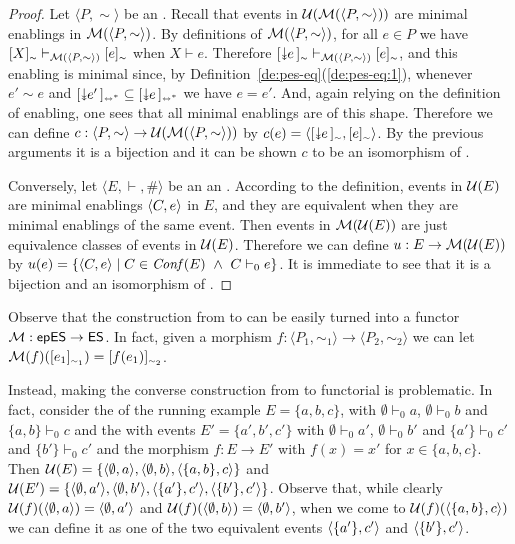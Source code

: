 \begin{proof}
  Let $\langle P, \sim \rangle$ be an {\eseqabbr}.
  Recall that events in
  $\unf{\fuse{\langle P, \sim\rangle}}$ are minimal
  enablings in $\fuse{\langle P, \sim\rangle}$.
  By definitions of $\fuse{\langle P, \sim\rangle}$, for all $e \in P$
  we have
  $\eqclass[\sim]{X} \vdash_{\fuse{\langle P, \sim\rangle}}
  \eqclass[\sim]{e}$ when $X \vdash e$. Therefore
  $\eqclass[\sim]{\scauses{e}} \vdash_{\fuse{\langle P, \sim\rangle}}
  \eqclass[\sim]{e}$, and this enabling is minimal since, by
  Definition~\ref{de:pes-eq}(\ref{de:pes-eq:1}), whenever $e' \sim e$
  and $\eqclassir{\scauses{e'}} \subseteq \eqclassir{\scauses{e}}$ we
  have $e=e'$. And, again relying on the definition of enabling, one
  sees that all minimal enablings are of this shape.
  Therefore we can define
  $c : \langle P, \sim \rangle \to \unf{\fuse{\langle P,
      \sim\rangle}}$ by
  $c(e) =
  \esir{\eqclass[\sim]{\scauses{e}}}{\eqclass[\sim]{e}}$.
  By the previous arguments it is a bijection and it can be shown $c$
  to be an isomorphism of {\eseqabbr}.
  

  \smallskip

  Conversely, let $\langle E, \vdash, \# \rangle$ be an an
  {\esabbr}.
  According to the definition, events in $\unf{E}$ are minimal
  enablings $\esir{C}{e}$ in $E$, and they are equivalent when they are minimal
  enablings of the same event.
  Then events in $\fuse{\unf{E}}$ are just equivalence classes of events in $\unf{E}$. Therefore we can define $u : E \to \fuse{\unf{E}}$ by
  $u(e) = \{ \esir{C}{e} \mid C \in \conf{E}\ \land\ C \vdash_0 e \}$. It is
  immediate to see that it is a bijection and 
  an isomorphism of {\esabbr}.
\end{proof}


Observe that the construction from {\eseqabbr} to {\esabbr} can be
easily turned into a functor $\zfuse : \epes \to \es$. In fact, given a
morphism
$f : \langle P_1, \sim_1 \rangle \to \langle P_2, \sim_2\rangle$ we
can let $\fuse{f}(\eqclass[\sim_1]{e_1}) = \eqclass[\sim_2]{f(e_1)}$.

Instead, making the converse construction from {\esabbr} to
{\eseqabbr} functorial is problematic. In fact, consider the {\esabbr} of the running example
$E = \{ a, b, c \}$, with $\emptyset \vdash_0 a$,
$\emptyset \vdash_0 b$ and $\{ a, b \} \vdash_0 c$ and the
{\esabbr} with events $E' = \{ a', b', c' \}$ with
$\emptyset \vdash_0 a'$, $\emptyset \vdash_0 b'$ and
$\{ a' \} \vdash_0 c'$ and $\{ b' \} \vdash_0 c'$ and the morphism
$f : E \to E'$ with $f(x) = x'$ for $x \in \{ a, b, c\}$. Then
$\unf{E} = \{ \esir{\emptyset}{a}, \esir{\emptyset}{b},
\esir{\{a, b\}}{c} \}$ and
$\unf{E'} = \{ \esir{\emptyset}{a'}, \esir{\emptyset}{b'},
\esir{\{a'\}}{c'}, \esir{\{b'\}}{c'} \}$. Observe that, while clearly
$\unf{f}(\esir{\emptyset}{a}) = \esir{\emptyset}{a'}$ and
$\unf{f}(\esir{\emptyset}{b}) = \esir{\emptyset}{b'}$, when we come
to $\unf{f}(\esir{\{a,b\}}{c})$ we can define it as one of the
two equivalent events $\esir{\{a'\}}{c'}$ and $\esir{\{b'\}}{c'}$.

